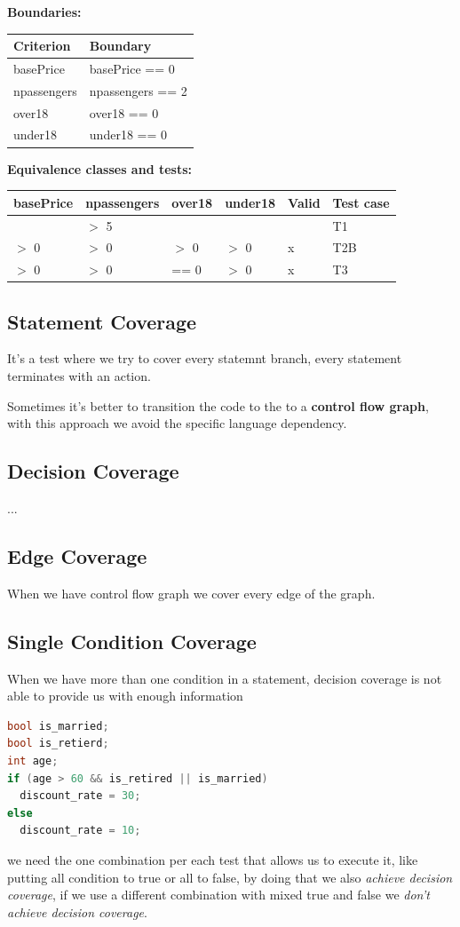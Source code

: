 \documentclass[12pt]{article}
\begin{document}
\textbf{Boundaries:}
\begin{center}
  \begin{tabular}{|l|l|}
    \hline
    Criterion & Boundary \\
    \hline
    basePrice & basePrice == 0 \\
    \hline
    npassengers & npassengers == 2 \\
    \hline
    over18 & over18 == 0 \\
    \hline
    under18 & under18 == 0 \\
    \hline
  \end{tabular}
\end{center}
\textbf{Equivalence classes and tests:}
\begin{center}
  \begin{tabular}{|l|l|l|l|l|l|}
    \hline
    basePrice & npassengers & over18 & under18 & Valid & Test case \\
    \hline
     & $>$ 5 & & & & T1 \\
     \hline
     $>$ 0 & $>$ 0 & $>$ 0 & $>$ 0 & x & T2B \\
    \hline
     $>$ 0 & $>$ 0 & == 0 & $>$ 0 & x & T3 \\
    \hline
  \end{tabular}
\end{center}

\subsection{Statement Coverage}
It's a test where we try to cover every statemnt branch, every statement terminates with an action.

Sometimes it's better to transition the code to the to a \textbf{control flow graph}, with this approach we avoid the specific language dependency.

\subsection{Decision Coverage}
...

\subsection{Edge Coverage}
When we have control flow graph we cover every edge of the graph.

\subsection{Single Condition Coverage}
When we have more than one condition in a statement, decision coverage is not able to provide us with enough information
\begin{lstlisting}[language=c]
bool is_married;
bool is_retierd;
int age;
if (age > 60 && is_retired || is_married)
  discount_rate = 30;
else
  discount_rate = 10;
\end{lstlisting}
we need the one combination per each test that allows us to execute it, like putting all condition to true or all to false, by doing that we also \emph{achieve decision coverage}, if we use a different combination with mixed true and false we \emph{don't achieve decision coverage}.
\end{document}
